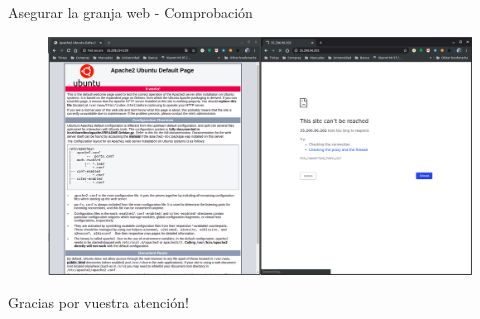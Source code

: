 \documentclass{beamer}
\begin{document}
\begin{frame}[fragile]{Asegurar la granja web - Comprobación}
  \begin{figure}[H]
		\centering
		\includegraphics[width=\textwidth]{project/new_firewall_ok.png}
	\end{figure}
\end{frame}

\begin{frame}[fragile]
 \begin{center}
  \Huge
  Gracias por vuestra atención!
 \end{center}

\end{frame}
\end{document}
